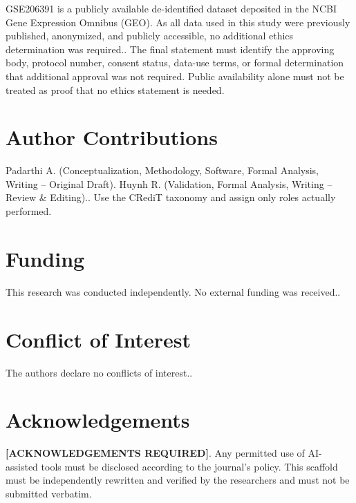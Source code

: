 \documentclass[nocrop]{bioinfo}
\newcommand{\ethicsrequired}{GSE206391 is a publicly available de-identified dataset deposited in the NCBI Gene Expression Omnibus (GEO). As all data used in this study were previously published, anonymized, and publicly accessible, no additional ethics determination was required.}
\newcommand{\fundingrequired}{This research was conducted independently. No external funding was received.}
\newcommand{\conflictrequired}{The authors declare no conflicts of interest.}
\newcommand{\contributionrequired}{Padarthi A. (Conceptualization, Methodology, Software, Formal Analysis, Writing -- Original Draft). Huynh R. (Validation, Formal Analysis, Writing -- Review \& Editing).}
\begin{document}
\ethicsrequired. The final statement must identify the approving body,
protocol number, consent status, data-use terms, or formal determination that
additional approval was not required. Public availability alone must not be
treated as proof that no ethics statement is needed.

\section*{Author Contributions}

\contributionrequired. Use the CRediT taxonomy and assign only roles actually
performed.

\section*{Funding}

\fundingrequired.

\section*{Conflict of Interest}

\conflictrequired.

\section*{Acknowledgements}

\textbf{[ACKNOWLEDGEMENTS REQUIRED]}. Any permitted use of AI-assisted tools
must be disclosed according to the journal's policy. This scaffold must be
independently rewritten and verified by the researchers and must not be
submitted verbatim.



\end{document}
